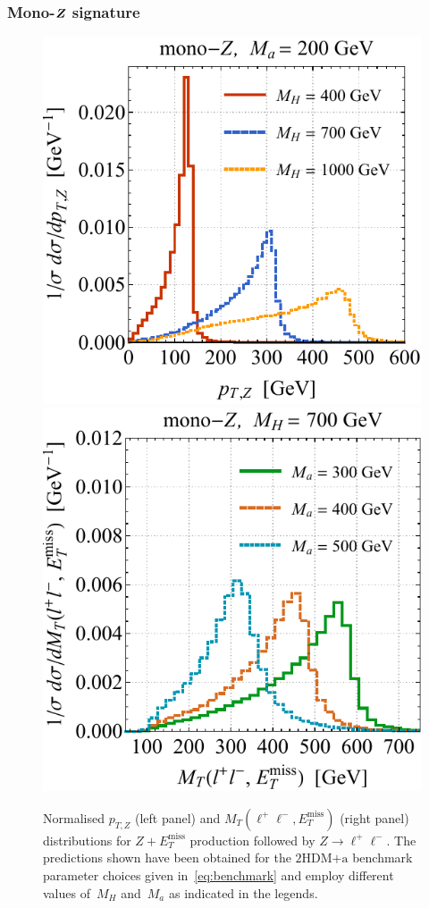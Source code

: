 \documentclass[a4paper, 11pt,notoc]{article}
\newcommand{\MET}{\ensuremath{E_T^\mathrm{miss}}\xspace}
\newcommand{\hdma}{\ensuremath{\textrm{2HDM+a}}\xspace}
\def\bm#1{\mbox{\boldmath$#1$\unboldmath}}
\begin{document}
\subsubsection[Mono-$Z$ signature]{Mono-$\bm{Z}$ signature}

\begin{figure}[t!]
\centering
\includegraphics[height=0.45\textwidth]{ptzspec.pdf}	\qquad 
\includegraphics[height=0.45\textwidth]{mtspec.pdf}
\vspace{2mm}
\caption{\label{fig:zptmt} Normalised $p_{T,Z}$ (left panel) and $M_T (\ell^+ \ell^-, \MET)$ (right panel) distributions for $Z + \MET$ production followed by $Z \to \ell^+ \ell^-$. The  predictions shown have been obtained for the \hdma benchmark parameter choices  given in~\eqref{eq:benchmark} and employ different values of~$M_H$ and~$M_a$ as indicated in the legends.}
\end{figure}
\end{document}
